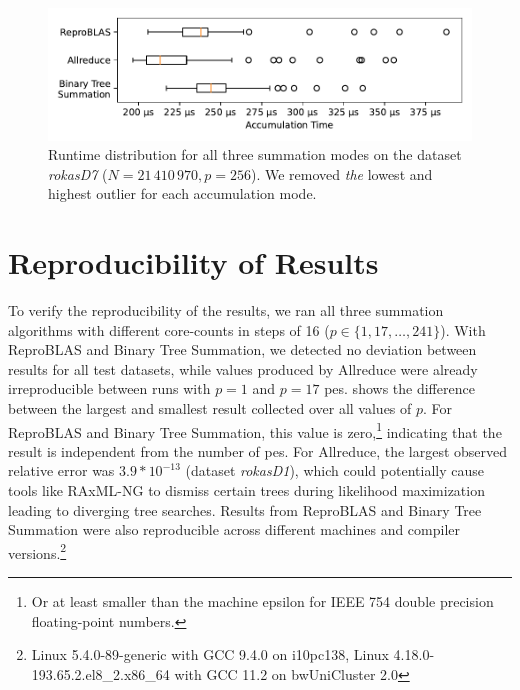 \begin{figure}
\centering
\includegraphics[scale=0.75]{figures/boxplotRokasD7.pdf}
\caption[Runtime distribution for all three summation modes on the dataset \textit{rokasD7}.]{Runtime distribution for all three summation modes on the dataset \textit{rokasD7} ($N = 21\,410\,970, p = 256$). We removed \textit{the} lowest and highest outlier for each accumulation mode.}
\label{fig:boxplotRokasD7}
\end{figure}


\section{Reproducibility of Results}
\label{sec:VerificationOfReproducibility}
To verify the reproducibility of the results, we ran all three summation algorithms with different core-counts in steps of 16 ($p \in \{1, 17, \ldots, 241 \}$).
With ReproBLAS and Binary Tree Summation, we detected no deviation between results for all test datasets, while values produced by Allreduce were already  irreproducible between runs with $p=1$ and $p=17$ \glspl{pe}.
 shows the difference between the largest and smallest result collected over all values of $p$.
For ReproBLAS and Binary Tree Summation, this value is zero,\footnote{Or at least smaller than the machine epsilon for IEEE 754 double precision floating-point numbers.} indicating that the result is independent from the number of \glspl{pe}.
For Allreduce, the largest observed relative error was $3.9 * 10^{-13}$ (dataset \textit{rokasD1}), which could potentially cause tools like RAxML-NG to dismiss certain trees during likelihood maximization leading to diverging tree searches.
Results from ReproBLAS and Binary Tree Summation were also reproducible across different machines and compiler versions.\footnote{Linux 5.4.0-89-generic with GCC 9.4.0 on i10pc138, Linux 4.18.0-193.65.2.el8\_2.x86\_64 with GCC 11.2 on bwUniCluster 2.0}

